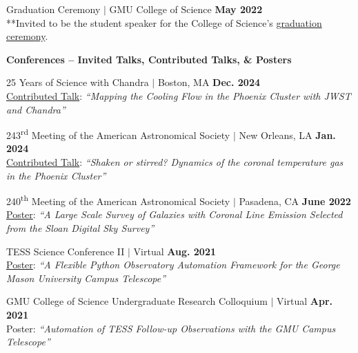 \documentclass[marg, centered]{res}
\begin{document}
\begin{resume}
\begin{talks}[itemindent=0pt, leftmargin=19pt]
\item Graduation Ceremony $|$ GMU College of Science \hfill \textbf{May 2022} \\
**Invited to be the student speaker for the College of Science's \href{https://www.youtube.com/watch?v=xsyi9sqYH4o}{\color{dkbu} graduation ceremony}.

\end{talks}

\textbf{Conferences -- Invited Talks, Contributed Talks, \& Posters}

\begin{talks}[itemindent=0pt, leftmargin=19pt]

\item 25 Years of Science with Chandra $|$ Boston, MA \hfill \textbf{Dec. 2024} \\
\href{https://cxc.cfa.harvard.edu/cdo/symposium_2024/schedule.html\#talk}{\color{dkbu} Contributed Talk}: \textit{``Mapping the Cooling Flow in the Phoenix Cluster with JWST and Chandra''}

\item 243\textsuperscript{rd} Meeting of the American Astronomical Society $|$ New Orleans, LA \hfill \textbf{Jan. 2024} \\
\href{https://ui.adsabs.harvard.edu/abs/2024AAS...24344204R/abstract}{\color{dkbu} Contributed Talk}: \textit{``Shaken or stirred? Dynamics of the coronal temperature gas in the Phoenix Cluster''}
    
\item 240\textsuperscript{th} Meeting of the American Astronomical Society $|$ Pasadena, CA \hfill \textbf{June 2022} \\
\href{https://ui.adsabs.harvard.edu/abs/2022AAS...24010113R/abstract}{\color{dkbu} Poster}: \textit{``A Large Scale Survey of Galaxies with Coronal Line Emission Selected from the Sloan Digital Sky Survey''}

\item TESS Science Conference II $|$ Virtual \hfill \textbf{Aug. 2021}\\
\href{https://zenodo.org/records/5114171}{\color{dkbu} Poster}: \textit{``A Flexible Python Observatory Automation Framework for the George Mason University Campus Telescope''}

\item GMU College of Science Undergraduate Research Colloquium $|$ Virtual \hfill \textbf{Apr. 2021}\\
Poster: \textit{``Automation of TESS Follow-up Observations with the GMU Campus Telescope''}


\end{talks}
\end{resume}
\end{document}
